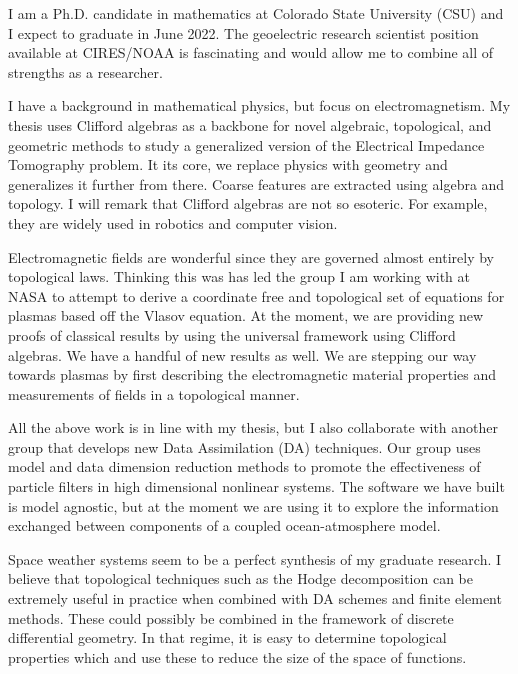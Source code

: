 \documentclass[12pt, letter]{awesome-cv}
\begin{document}
\makecvheader
\makelettertitle
\begin{cvletter}


I am a Ph.D. candidate in mathematics at Colorado State University (CSU) and I expect to graduate in June 2022. The geoelectric research scientist position available at CIRES/NOAA is fascinating and would allow me to combine all of strengths as a researcher.

I have a background in mathematical physics, but focus on electromagnetism. My thesis uses Clifford algebras as a backbone for novel algebraic, topological, and geometric methods to study a generalized version of the Electrical Impedance Tomography problem. It its core, we replace physics with geometry and generalizes it further from there. Coarse features are extracted using algebra and topology. I will remark that Clifford algebras are not so esoteric. For example, they are widely used in robotics and computer vision.

Electromagnetic fields are wonderful since they are governed almost entirely by topological laws. Thinking this was has led the group I am working with at NASA to attempt to derive a coordinate free and topological set of equations for plasmas based off the Vlasov equation. At the moment, we are providing new proofs of classical results by using the universal framework using Clifford algebras. We have a handful of new results as well. We are stepping our way towards plasmas by first describing the electromagnetic material properties and measurements of fields in a topological manner.

All the above work is in line with my thesis, but I also collaborate with another group that develops new Data Assimilation (DA) techniques. Our group uses model and data dimension reduction methods to promote the effectiveness of particle filters in high dimensional nonlinear systems. The software we have built is model agnostic, but at the moment we are using it to explore the information exchanged between components of a coupled ocean-atmosphere model.

Space weather systems seem to be a perfect synthesis of my graduate research. I believe that topological techniques such as the Hodge decomposition can be extremely useful in practice when combined with DA schemes and finite element methods. These could possibly be combined in the framework of discrete differential geometry. In that regime, it is easy to determine topological properties which and use these to reduce the size of the space of functions.


\end{cvletter}
\end{document}
